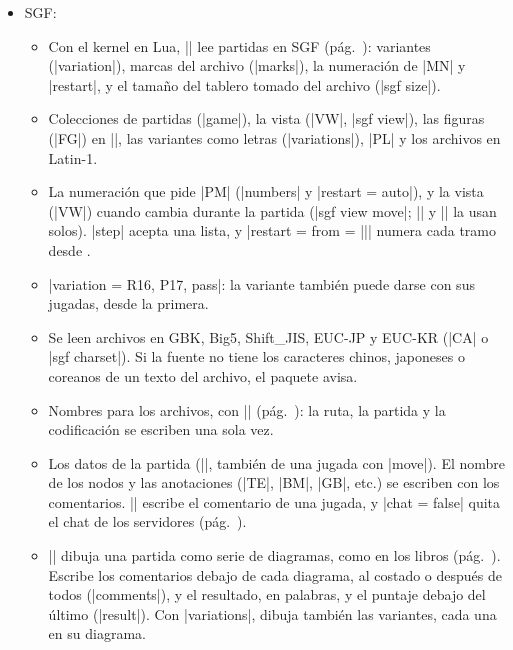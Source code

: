 \begin{itemize}
\begin{itemize}
			\item SGF:
				\begin{itemize}
					\item Con el kernel en Lua, |\sgf| lee partidas en SGF (pág.~\pageref{subsec:sgftablero}): variantes (|variation|), marcas del archivo (|marks|), la numeración de |MN| y |restart|, y el tamaño del tablero tomado del archivo (|sgf size|).
					\item Colecciones de partidas (|game|), la vista (|VW|, |sgf view|), las figuras (|FG|) en |\sgfdiagrams|, las variantes como letras (|variations|), |PL| y los archivos en Latin-1.
					\item La numeración que pide |PM| (|numbers| y |restart = auto|), y la vista (|VW|) cuando cambia durante la partida (|sgf view move|; |\sgfdiagrams| y |\sgfanimation| la usan solos). |step| acepta una lista, y |restart = {from = ||}| numera cada tramo desde .
					\item |variation = {R16, P17, pass}|: la variante también puede darse con sus jugadas, desde la primera.
					\item Se leen archivos en GBK, Big5, Shift\_JIS, EUC-JP y EUC-KR (|CA| o |sgf charset|). Si la fuente no tiene los caracteres chinos, japoneses o coreanos de un texto del archivo, el paquete avisa.
					\item Nombres para los archivos, con |\pgfgodefinesgf| (pág.~\pageref{subsec:sgfnombres}): la ruta, la partida y la codificación se escriben una sola vez.
					\item Los datos de la partida (|\sgfinfo|, también de una jugada con |move|). El nombre de los nodos y las anotaciones (|TE|, |BM|, |GB|, etc.) se escriben con los comentarios. |\sgfcomment| escribe el comentario de una jugada, y |chat = false| quita el chat de los servidores (pág.~\pageref{subsec:sgfdatos}).
					\item |\sgfdiagrams| dibuja una partida como serie de diagramas, como en los libros (pág.~\pageref{subsec:sgfdiagramas}). Escribe los comentarios debajo de cada diagrama, al costado o después de todos (|comments|), y el resultado, en palabras, y el puntaje debajo del último (|result|). Con |variations|, dibuja también las variantes, cada una en su diagrama.

\end{itemize}
\end{itemize}
\end{itemize}
